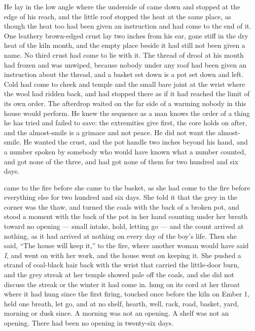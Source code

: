 He lay in the low angle where the underside of  came down and stopped at the edge of his reach, and the little roof stopped the heat at the same place, as though the heat too had been given an instruction and had come to the end of it. One leathery brown-edged crust lay two inches from his ear, gone stiff in the dry heat of the kiln month, and the empty place beside it had still not been given a name. No third crust had come to lie with it. The thread of drool at his mouth had frozen and was unwiped, because nobody under any roof had been given an instruction about the thread, and a basket set down is a pot set down and left. Cold had come to cheek and temple and the small bare joint at the wrist where the wool had ridden back, and had stopped there as if it had reached the limit of its own order. The afterdrop waited on the far side of a warming nobody in this house would perform. He knew the sequence as a man knows the order of a thing he has tried and failed to save: the extremities give first, the core holds on after, and the almost-smile is a grimace and not peace. He did not want the almost-smile. He wanted the crust, and the pot handle two inches beyond his hand, and a number spoken by somebody who would have known what a number counted, and got none of the three, and had got none of them for two hundred and six days.

\scenebreak

 came to the fire before she came to the basket, as she had come to the fire before everything else for two hundred and six days. She told it that the grey in the corner was the thaw, and turned the coals with the back of a broken pot, and stood a moment with the back of the pot in her hand counting under her breath toward no opening --- small intake, hold, letting go --- and the count arrived at nothing, as it had arrived at nothing on every day of the boy's life. Then she said, “The house will keep it,” to the fire, where another woman would have said \emph{I}, and went on with her work, and the house went on keeping it. She pushed a strand of coal-black hair back with the wrist that carried the little-door burn, and the grey streak at her temple showed pale off the coals, and she did not discuss the streak or the winter it had come in.  hung on its cord at her throat where it had hung since the first firing, touched once before the kiln on Ember 1, held one breath, let go, and at no shelf, hearth, well, rack, road, basket, yard, morning or dusk since. A morning was not an opening. A shelf was not an opening. There had been no opening in twenty-six days.

